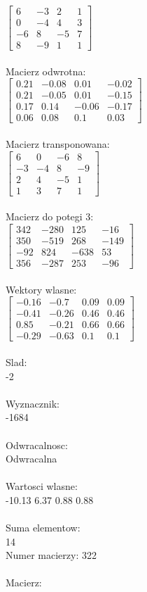 \documentclass[a4paper,12pt]{article}
\begin{document}
$\begin{bmatrix} 6&-3&2&1\\0&-4&4&3\\-6&8&-5&7\\8&-9&1&1 \end{bmatrix}$
\\
\\
Macierz odwrotna:\\

$\begin{bmatrix} 0.21&-0.08&0.01&-0.02\\0.21&-0.05&0.01&-0.15\\0.17&0.14&-0.06&-0.17\\0.06&0.08&0.1&0.03 \end{bmatrix}$
\\
\\
Macierz transponowana:\\

$\begin{bmatrix} 6&0&-6&8\\-3&-4&8&-9\\2&4&-5&1\\1&3&7&1 \end{bmatrix}$
\\
\\
Macierz do potegi 3:\\

$\begin{bmatrix} 342&-280&125&-16\\350&-519&268&-149\\-92&824&-638&53\\356&-287&253&-96 \end{bmatrix}$
\\
\\
Wektory wlasne:\\

$\begin{bmatrix} -0.16&-0.7&0.09&0.09\\-0.41&-0.26&0.46&0.46\\0.85&-0.21&0.66&0.66\\-0.29&-0.63&0.1&0.1 \end{bmatrix}$
\\
\\
Slad:\\
-2
\\
\\
Wyznacznik:\\
-1684
\\
\\
Odwracalnosc:\\
Odwracalna
\\
\\
Wartosci wlasne:\\
-10.13 6.37 0.88 0.88
\\
\\
Suma elementow:\\
14
\\
\newpage
Numer macierzy:
322
\\
\\
Macierz:\\
\end{document}
